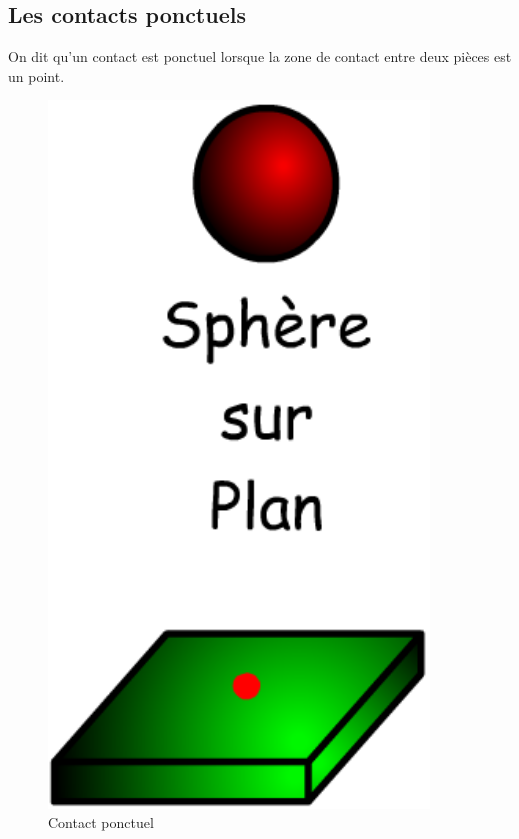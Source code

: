 \documentclass[10pt,fleqn]{article} %
\begin{document}
  \subsection{Les contacts ponctuels}
  \begin{defi}
    On dit qu'un contact est ponctuel lorsque la zone de contact entre deux pièces est un point.
  \end{defi}
\begin{figure}[h]
  \centering
  \includegraphics[width=0.9\textwidth,height=.2\textheight,keepaspectratio]{images/ponctuel}
  \caption{Contact ponctuel}
  \label{fig:ponctuel}
\end{figure}
\pagebreak
\end{document}

